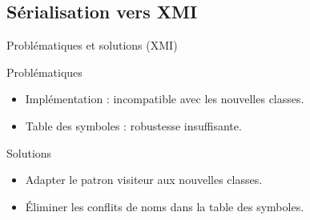 \subsection{Sérialisation vers XMI}

\begin{frame}{Problématiques et solutions (XMI)}
    \begin{block}{Problématiques}
        
        \begin{itemize}
            \item Implémentation : incompatible avec les nouvelles classes.
            \item Table des symboles : robustesse insuffisante.
        \end{itemize}
    \end{block}
    
    
    {
    
    \begin{block}{Solutions}
        \begin{itemize}
            \item Adapter le patron visiteur aux nouvelles classes.
            \item Éliminer les conflits de noms dans la table des symboles.
        \end{itemize}
    \end{block}
    
    }
    
    
\end{frame}
